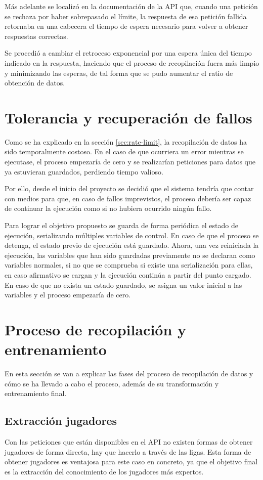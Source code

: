 Más adelante se localizó en la documentación de la API que, cuando una petición se rechaza por haber sobrepasado el límite, la respuesta de esa petición fallida retornaba en una cabecera el tiempo de espera necesario para volver a obtener respuestas correctas.

Se procedió a cambiar el retroceso exponencial por una espera única del tiempo indicado en la respuesta, haciendo que el proceso de recopilación fuera más limpio y minimizando las esperas, de tal forma que se pudo aumentar el ratio de obtención de datos.

\section{Tolerancia y recuperación de fallos}\label{sec:fault-tolerance}
Como se ha explicado en la sección \ref{sec:rate-limit}, la recopilación de datos ha sido temporalmente costoso. En el caso de que ocurriera un error mientras se ejecutase, el proceso empezaría de cero y se realizarían peticiones para datos que ya estuvieran guardados, perdiendo tiempo valioso.

Por ello, desde el inicio del proyecto se decidió que el sistema tendría que contar con medios para que, en caso de fallos imprevistos, el proceso debería ser capaz de continuar la ejecución como si no hubiera ocurrido ningún fallo.

Para lograr el objetivo propuesto se guarda de forma periódica el estado de ejecución, serializando múltiples variables de control. En caso de que el proceso se detenga, el estado previo de ejecución está guardado. Ahora, una vez reiniciada la ejecución, las variables que han sido guardadas previamente no se declaran como variables normales, si no que se comprueba si existe una serialización para ellas, en caso afirmativo se cargan y la ejecución continúa a partir del punto cargado. En caso de que no exista un estado guardado, se asigna un valor inicial a las variables y el proceso empezaría de cero.

\section{Proceso de recopilación y entrenamiento}
En esta sección se van a explicar las fases del proceso de recopilación de datos y cómo se ha llevado a cabo el proceso, además de su transformación y entrenamiento final.

\subsection{Extracción jugadores}
Con las peticiones que están disponibles en el API no existen formas de obtener jugadores de forma directa, hay que hacerlo a través de las ligas. Esta forma de obtener jugadores es ventajosa para este caso en concreto, ya que el objetivo final es la extracción del conocimiento de los jugadores más expertos.

